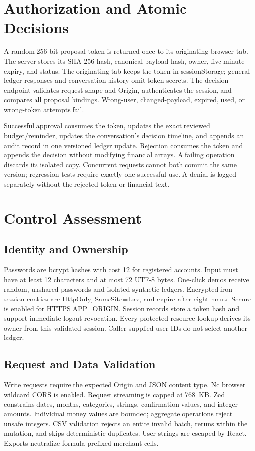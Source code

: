 \documentclass[conference,a4paper]{IEEEtran}
\begin{document}
\section{Authorization and Atomic Decisions}
A random 256-bit proposal token is returned once to its originating browser tab. The server stores its SHA-256 hash, canonical payload hash, owner, five-minute expiry, and status. The originating tab keeps the token in sessionStorage; general ledger responses and conversation history omit token secrets. The decision endpoint validates request shape and Origin, authenticates the session, and compares all proposal bindings. Wrong-user, changed-payload, expired, used, or wrong-token attempts fail.

Successful approval consumes the token, updates the exact reviewed budget/reminder, updates the conversation's decision timeline, and appends an audit record in one versioned ledger update. Rejection consumes the token and appends the decision without modifying financial arrays. A failing operation discards its isolated copy. Concurrent requests cannot both commit the same version; regression tests require exactly one successful use. A denial is logged separately without the rejected token or financial text.

\section{Control Assessment}
\subsection{Identity and Ownership}
Passwords are bcrypt hashes with cost 12 for registered accounts. Input must have at least 12 characters and at most 72 UTF-8 bytes. One-click demos receive random, unshared passwords and isolated synthetic ledgers. Encrypted iron-session cookies are HttpOnly, SameSite=Lax, and expire after eight hours. Secure is enabled for HTTPS APP\_ORIGIN. Session records store a token hash and support immediate logout revocation. Every protected resource lookup derives its owner from this validated session. Caller-supplied user IDs do not select another ledger.

\subsection{Request and Data Validation}
Write requests require the expected Origin and JSON content type. No browser wildcard CORS is enabled. Request streaming is capped at 768~KB. Zod constrains dates, months, categories, strings, confirmation values, and integer amounts. Individual money values are bounded; aggregate operations reject unsafe integers. CSV validation rejects an entire invalid batch, reruns within the mutation, and skips deterministic duplicates. User strings are escaped by React. Exports neutralize formula-prefixed merchant cells.
\end{document}
